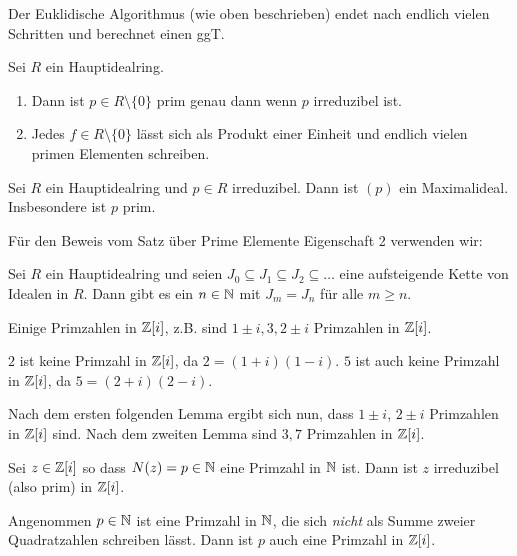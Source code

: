 \begin{lemma}
	Der Euklidische Algorithmus (wie oben beschrieben) endet nach endlich vielen Schritten und berechnet einen ggT.
\end{lemma}


\begin{theorem}
	Sei $R$ ein Hauptidealring.
	\begin{enumerate}[1)]
		\item Dann ist $p \in R \setminus \{0\} $ prim genau dann wenn $p$ irreduzibel ist.
		\item Jedes $f \in R \setminus \{0\} $ lässt sich als Produkt einer Einheit und endlich vielen primen Elementen schreiben.
	\end{enumerate}
\end{theorem}


\begin{theorem}
	Sei $R$ ein Hauptidealring und $p \in R$ irreduzibel.
	Dann ist $(p)$ ein Maximalideal. Insbesondere ist $p$ prim.
\end{theorem}


Für den Beweis vom Satz über Prime Elemente Eigenschaft 2 verwenden wir:
\begin{proposition}
	Sei $R$ ein Hauptidealring und seien $J_0 \subseteq J_1 \subseteq J_2 \subseteq \ldots$ eine aufsteigende Kette von Idealen in $R$.
	Dann gibt es ein $n \in \mathbb{N}$ mit $J_{m} = J_{n}$ für alle $m \geq n$.
\end{proposition}



\begin{eg}
	Einige Primzahlen in $\mathbb{Z}[i]$, z.B. sind $1\pm i,3,2\pm i$ Primzahlen in $\mathbb{Z}[i]$.

	$2$ ist keine Primzahl in $\mathbb{Z}[i]$, da $2 = (1+i)(1-i)$.
	$5$ ist auch keine Primzahl in $\mathbb{Z}[i]$, da $5 = (2+i)(2-i)$.

	Nach dem ersten folgenden Lemma ergibt sich nun, dass $1 \pm i$, $2 \pm i$ Primzahlen in $\mathbb{Z}[i]$ sind.
	Nach dem zweiten Lemma sind $3,7$ Primzahlen in $\mathbb{Z}[i]$.
\end{eg}

\begin{lemma}
	Sei $z \in \mathbb{Z}[i]$ so dass $N(z) = p \in \mathbb{N}$ eine Primzahl in $\mathbb{N}$ ist.
	Dann ist $z$ irreduzibel (also prim) in $\mathbb{Z}[i]$.
\end{lemma}


\begin{lemma}
	Angenommen $p \in \mathbb{N}$ ist eine Primzahl in $\mathbb{N}$, die sich \emph{nicht} als Summe zweier Quadratzahlen schreiben lässt.
	Dann ist $p$ auch eine Primzahl in $\mathbb{Z}[i]$.
\end{lemma}



